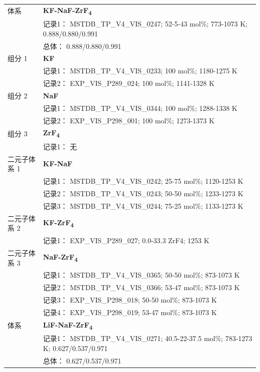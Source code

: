 \documentclass[12pt]{article}
\begin{document}
{\begin{longtable}[]{@{}
  >{\raggedright\arraybackslash}p{}
  >{\raggedright\arraybackslash}p{}@{}}
\midrule
体系 & \textbf{KF-NaF-ZrF\textsubscript{4}} \\
 & 记录1： MSTDB\_TP\_V4\_VIS\_0247; 52-5-43 mol\%; 773-1073 K; 0.888/0.880/0.991 \\
 & 总体： 0.888/0.880/0.991  \\

组分 1  & \textbf{KF} \\
 & 记录1： MSTDB\_TP\_V4\_VIS\_0233; 100 mol\%; 1180-1275 K \\
 & 记录2： EXP\_VIS\_P289\_024; 100 mol\%; 1141-1328 K  \\

组分 2  & \textbf{NaF} \\
 & 记录1： MSTDB\_TP\_V4\_VIS\_0344; 100 mol\%; 1288-1338 K \\
 & 记录2： EXP\_VIS\_P298\_001; 100 mol\%; 1273-1373 K  \\

组分 3 & \textbf{ZrF\textsubscript{4}} \\
 & 记录1： 无 \\
二元子体系 1  & \textbf{KF-NaF} \\
 & 记录1： MSTDB\_TP\_V4\_VIS\_0242; 25-75 mol\%; 1120-1253 K \\
 & 记录2： MSTDB\_TP\_V4\_VIS\_0243; 50-50 mol\%; 1233-1273 K \\
 & 记录3： MSTDB\_TP\_V4\_VIS\_0244; 75-25 mol\%; 1133-1273 K  \\

二元子体系 2  & \textbf{KF-ZrF\textsubscript{4}} \\
 & 记录1： EXP\_VIS\_P289\_027; 0.0-33.3 ZrF4; 1253 K  \\

二元子体系 3  & \textbf{NaF-ZrF\textsubscript{4}} \\
 & 记录1： MSTDB\_TP\_V4\_VIS\_0365; 50-50 mol\%; 873-1073 K \\
 & 记录2： MSTDB\_TP\_V4\_VIS\_0366; 53-47 mol\%; 873-1073 K \\
 & 记录3： EXP\_VIS\_P298\_018; 50-50 mol\%; 873-1073 K \\
 & 记录4： EXP\_VIS\_P298\_019; 53-47 mol\%; 873-1073 K  \\

\midrule
体系 & \textbf{LiF-NaF-ZrF\textsubscript{4}} \\
 & 记录1： MSTDB\_TP\_V4\_VIS\_0271; 40.5-22-37.5 mol\%; 783-1273 K; 0.627/0.537/0.971 \\
 & 总体： 0.627/0.537/0.971  \\


\end{longtable}}
\end{document}
